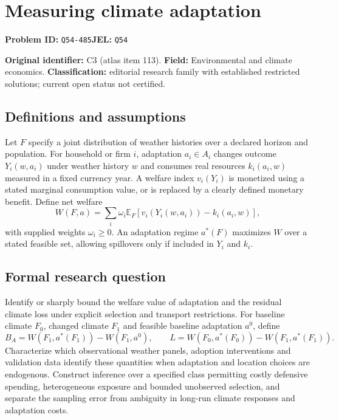 \documentclass[11pt,a4paper]{article}
\begin{document}
\section*{Measuring climate adaptation}
\textbf{Problem ID:} \texttt{Q54-485}\quad \textbf{JEL:} \texttt{Q54}\par
\label{problem:OP-0113}
\label{atlas:prob:C3}

\noindent\textbf{Original identifier:} C3 (atlas item 113). \textbf{Field:} Environmental and climate economics. \textbf{Classification:} editorial research family with established restricted solutions; current open status not certified.

\subsection*{Definitions and assumptions}

Let $F$ specify a joint distribution of weather histories over a declared horizon and population. For household or firm $i$, adaptation $a_i\in A_i$ changes outcome $Y_i(w,a_i)$ under weather history $w$ and consumes real resources $k_i(a_i,w)$ measured in a fixed currency year. A welfare index $v_i(Y_i)$ is monetized using a stated marginal consumption value, or is replaced by a clearly defined monetary benefit. Define net welfare
\[
W(F,a)=\sum_i\omega_i\mathbb E_F[v_i(Y_i(w,a_i))-k_i(a_i,w)],
\]
with supplied weights $\omega_i\ge0$. An adaptation regime $a^*(F)$ maximizes $W$ over a stated feasible set, allowing spillovers only if included in $Y_i$ and $k_i$.

\subsection*{Formal research question}

Identify or sharply bound the welfare value of adaptation and the residual climate loss under explicit selection and transport restrictions. For baseline climate $F_0$, changed climate $F_1$ and feasible baseline adaptation $a^0$, define
\[
B_A=W(F_1,a^*(F_1))-W(F_1,a^0),\qquad
L=W(F_0,a^*(F_0))-W(F_1,a^*(F_1)).
\]
Characterize which observational weather panels, adoption interventions and validation data identify these quantities when adaptation and location choices are endogenous. Construct inference over a specified class permitting costly defensive spending, heterogeneous exposure and bounded unobserved selection, and separate the sampling error from ambiguity in long-run climate responses and adaptation costs.
\end{document}
